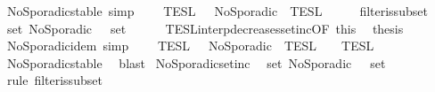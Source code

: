 \begin{isabellebody}
{}
\isamarkuptrue%
%
\endisatagdocument
{\isafolddocument}%
%
\isadelimdocument
%
\endisadelimdocument
{}\isamarkupfalse%
\ NoSporadic{\isacharunderscore}stable\ {\isacharbrackleft}simp{\isacharbrackright}{\isacharcolon}\isanewline
\ \ {\isacartoucheopen}{\isasymlbrakk}{\isasymlbrakk}\ {\isasymPhi}\ {\isasymrbrakk}{\isasymrbrakk}\isactrlsub T\isactrlsub E\isactrlsub S\isactrlsub L\ {\isasymsubseteq}\ {\isasymlbrakk}{\isasymlbrakk}\ NoSporadic\ {\isasymPhi}\ {\isasymrbrakk}{\isasymrbrakk}\isactrlsub T\isactrlsub E\isactrlsub S\isactrlsub L{\isacartoucheclose}\isanewline
%
\isadelimproof
%
\endisadelimproof
%
\isatagproof
{}\isamarkupfalse%
\ {\isacharminus}\isanewline
\ \ \isamarkupfalse%
\ filter{\isacharunderscore}is{\isacharunderscore}subset\ \isamarkupfalse%
\ {\isacartoucheopen}set\ {\isacharparenleft}NoSporadic\ {\isasymPhi}{\isacharparenright}\ {\isasymsubseteq}\ set\ {\isasymPhi}{\isacartoucheclose}\ \isacommand{{\isachardot}}\isamarkupfalse%
\isanewline
\ \ \isamarkupfalse%
\ TESL{\isacharunderscore}interp{\isacharunderscore}decreases{\isacharunderscore}setinc{\isacharbrackleft}OF\ this{\isacharbrackright}\ \isamarkupfalse%
\ {\isacharquery}thesis\ \isacommand{{\isachardot}}\isamarkupfalse%
\isanewline
{}\isamarkupfalse%
%
\endisatagproof
{\isafoldproof}%
%
\isadelimproof
\isanewline
%
\endisadelimproof
\isanewline
{}\isamarkupfalse%
\ NoSporadic{\isacharunderscore}idem\ {\isacharbrackleft}simp{\isacharbrackright}{\isacharcolon}\isanewline
\ \ {\isacartoucheopen}{\isasymlbrakk}{\isasymlbrakk}\ {\isasymPhi}\ {\isasymrbrakk}{\isasymrbrakk}\isactrlsub T\isactrlsub E\isactrlsub S\isactrlsub L\ {\isasyminter}\ {\isasymlbrakk}{\isasymlbrakk}\ NoSporadic\ {\isasymPhi}\ {\isasymrbrakk}{\isasymrbrakk}\isactrlsub T\isactrlsub E\isactrlsub S\isactrlsub L\ {\isacharequal}\ {\isasymlbrakk}{\isasymlbrakk}\ {\isasymPhi}\ {\isasymrbrakk}{\isasymrbrakk}\isactrlsub T\isactrlsub E\isactrlsub S\isactrlsub L{\isacartoucheclose}\isanewline
%
\isadelimproof
%
\endisadelimproof
%
\isatagproof
{}\isamarkupfalse%
\ NoSporadic{\isacharunderscore}stable\ \isamarkupfalse%
\ blast%
\endisatagproof
{\isafoldproof}%
%
\isadelimproof
\isanewline
%
\endisadelimproof
\isanewline
{}\isamarkupfalse%
\ NoSporadic{\isacharunderscore}setinc{\isacharcolon}\isanewline
\ \ {\isacartoucheopen}set\ {\isacharparenleft}NoSporadic\ {\isasymPhi}{\isacharparenright}\ {\isasymsubseteq}\ set\ {\isasymPhi}{\isacartoucheclose}\isanewline
%
\isadelimproof
%
\endisadelimproof
%
\isatagproof
{}\isamarkupfalse%
\ {\isacharparenleft}rule\ filter{\isacharunderscore}is{\isacharunderscore}subset{\isacharparenright}\isanewline
%
\endisatagproof
{\isafoldproof}%
%
\isadelimproof
%
\endisadelimproof
\isanewline
%
\isadelimtheory
%
\endisadelimtheory
%
\isatagtheory
{}\isamarkupfalse%
%
\endisatagtheory
{\isafoldtheory}%
%
\isadelimtheory
%
\endisadelimtheory
%
\end{isabellebody}%
